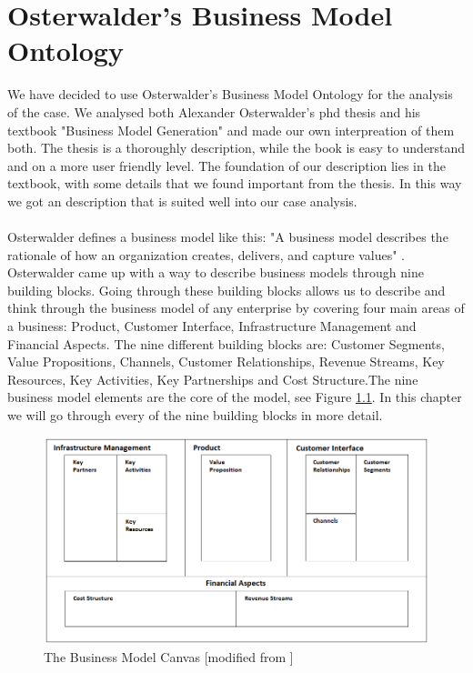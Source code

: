 \chapter{Osterwalder's Business Model Ontology}
We have decided to use Osterwalder's Business Model Ontology for the analysis of the case. We analysed both Alexander Osterwalder's phd thesis \cite{osterwalderthesis} and his textbook "Business Model Generation" \cite{osterwalder} and made our own interpreation of them both. The thesis is a thoroughly description, while the book is easy to understand and on a more user friendly level. The foundation of our description lies in the textbook, with some details that we found important from the thesis. In this way we got an description that is suited well into our case analysis.\\ \\
Osterwalder defines a business model like this: "A business model describes the rationale of how an organization creates, delivers, and capture values" \cite{osterwalder}. Osterwalder came up with a way to describe business models through nine building blocks. Going through these building blocks allows us to describe and think through the business model of any enterprise by covering four main areas of a business:  Product, Customer Interface, Infrastructure Management and Financial Aspects. The nine different building blocks are: Customer Segments, Value Propositions, Channels, Customer Relationships, Revenue Streams, Key Resources, Key Activities, Key Partnerships and Cost Structure.The nine business model elements are the core of the model, see Figure \ref{fig:TheBusinessModelCanvas}. In this chapter we will go through every of the nine building blocks in more detail. \cite{osterwalder}
\newpage

\begin{figure}[h]
\caption[The Business Model Canvas]{The Business Model Canvas [modified from \cite{osterwalder}]}
\label{fig:TheBusinessModelCanvas}
\begin{center}
\includegraphics[angle=90, scale=0.7]{osterwaldersbmmodified}
\end{center}
\end{figure}


